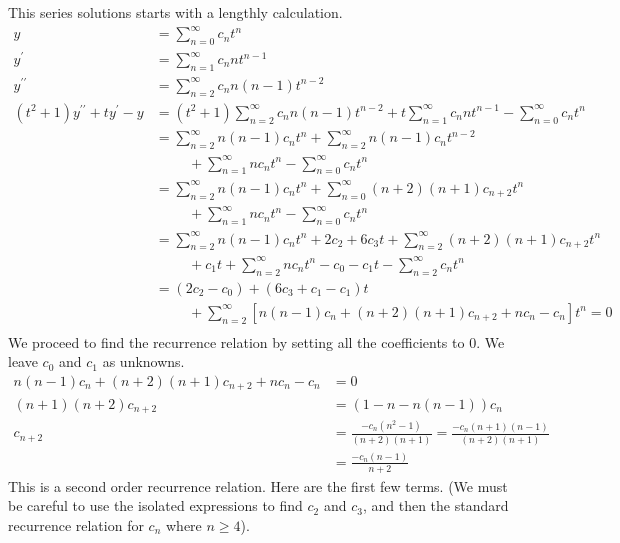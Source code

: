 \documentclass[fleqn,letterpaper]{report}
\begin{document}
\begin{example}
This series solutions starts with a lengthly calculation.
\begin{align*}
y & = \sum_{n=0}^\infty c_n t^n \\
y^\prime & = \sum_{n=1}^\infty c_n nt^{n-1} \\
y^{\prime\prime} & = \sum_{n=2}^\infty c_n n(n-1)t^{n-2} \\
(t^2+1)y^{\prime \prime} + ty^\prime - y & = 
(t^2+1) \sum_{n=2}^\infty c_n n(n-1)t^{n-2} 
+ t \sum_{n=1}^\infty c_n nt^{n-1} 
- \sum_{n=0}^\infty c_n t^n \\
& = \sum_{n=2}^\infty n (n-1) c_n t^n
+ \sum_{n=2}^\infty n (n-1) c_n t^{n-2} \\
& \hspace{1cm} + \sum_{n=1}^\infty n c_n t^n 
- \sum_{n=0}^\infty c_n t^n \\
& = \sum_{n=2}^\infty n (n-1) c_n t^n
+ \sum_{n=0}^\infty (n+2) (n+1) c_{n+2} t^n \\
& \hspace{1cm} + \sum_{n=1}^\infty n c_n t^n 
- \sum_{n=0}^\infty c_n t^n \\
& = \sum_{n=2}^\infty n (n-1) c_n t^n
+ 2c_2 + 6c_3t + \sum_{n=2}^\infty (n+2) (n+1) c_{n+2} t^n \\
& \hspace{1cm} + c_1 t + \sum_{n=2}^\infty n c_n t^n 
- c_0 - c_1 t - \sum_{n=2}^\infty c_n t^n \\
& = (2c_2 - c_0) + (6c_3 + c_1 - c_1) t \\
& \hspace{1cm} + \sum_{n=2}^\infty
\left[ n (n-1) c_n + (n+2) (n+1) c_{n+2} + n c_n 
- c_n \right] t^n = 0\\
\end{align*}
We proceed to find the recurrence relation by setting all the
coefficients to $0$. We leave $c_0$ and $c_1$ as unknowns. 
\begin{align*}
n (n-1) c_n + (n+2) (n+1) c_{n+2} + n c_n - c_n & = 0 \\
(n+1) (n+2) c_{n+2} & = (1 - n - n(n-1)) c_n \\
c_{n+2} & = \frac{-c_n (n^2-1)}{(n+2)(n+1)} = \frac{-c_n
(n+1)(n-1)}{(n+2)(n+1)} \\
& = \frac{ -c_n (n-1)}{n+2} 
\end{align*}
This is a second order recurrence relation. Here are the
first few terms. (We must be careful to use the isolated
expressions to find $c_2$ and $c_3$, and then the standard
recurrence relation for $c_n$ where $n \geq 4$).
\begin{align*}

\end{align*}
\end{example}
\end{document}
